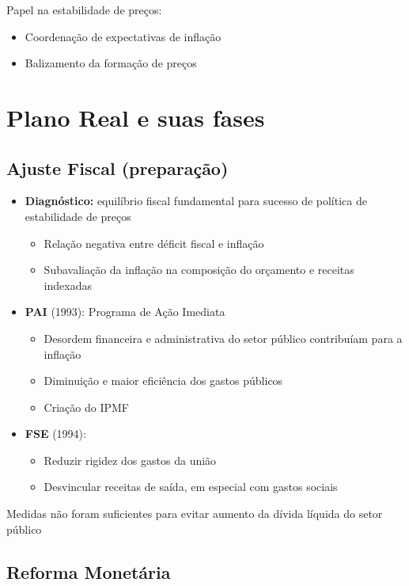 \documentclass[11pt]{article}
\begin{document}
Papel na estabilidade de preços:

\begin{itemize}
\item Coordenação de expectativas de inflação
\item Balizamento da formação de preços
\end{itemize}

\section*{Plano Real e suas fases}
\label{sec:org0787d82}

\subsection*{Ajuste Fiscal (preparação)}
\label{sec:org882f60c}

\begin{itemize}
\item \textbf{Diagnóstico:} equilíbrio fiscal fundamental para sucesso de política de estabilidade de preços
\begin{itemize}
\item Relação negativa entre déficit fiscal e inflação
\item Subavaliação da inflação na composição do orçamento e receitas indexadas
\end{itemize}
\item \textbf{PAI} (1993): Programa de Ação Imediata
\begin{itemize}
\item Desordem financeira e administrativa do setor público contribuíam para a inflação
\item Diminuição e maior eficiência dos gastos públicos
\item Criação do IPMF
\end{itemize}
\item \textbf{FSE} (1994):
\begin{itemize}
\item Reduzir rigidez dos gastos da união
\item Desvincular receitas de saída, em especial com gastos sociais
\end{itemize}
\end{itemize}

Medidas não foram suficientes para evitar aumento da dívida líquida do setor público

\subsection*{Reforma Monetária}
\label{sec:org27d68a4}
\end{document}
